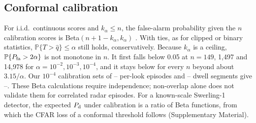 \documentclass[journal]{IEEEtran}
\newcommand{\PP}{\mathbb{P}}
\begin{document}
\subsection{Conformal calibration}\label{sec:calib}
For i.i.d.\ continuous scores and $k_\alpha\le n$, the false-alarm probability given the $n$ calibration scores is Beta$(n+1-k_\alpha,k_\alpha)$ \cite{vovk2012}. With ties, as for clipped or binary statistics, $\PP\{T>\widehat q\}\le\alpha$ still holds, conservatively. Because $k_\alpha$ is a ceiling, $\PP\{P_{\rm fa}>2\alpha\}$ is not monotone in $n$. It first falls below 0.05 at $n=149$, 1,497 and 14,978 for $\alpha=10^{-2},10^{-3},10^{-4}$, and it stays below for every $n$ beyond about $3.15/\alpha$. Our $10^{-4}$ calibration sets of \LowCalMin--\LowCalMax{} per-look episodes and \DwellCalMin--\DwellCalMax{} dwell segments give \LowCalPtwoMin--\LowCalPtwoMax. These Beta calculations require independence; non-overlap alone does not validate them for correlated radar episodes. For a known-scale Swerling-1 detector, the expected $P_{\rm d}$ under calibration is a ratio of Beta functions, from which the CFAR loss of a conformal threshold follows \cite{watts2007cfarloss} (Supplementary Material).
\end{document}
